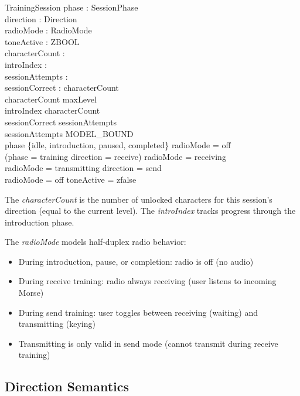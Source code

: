 \documentclass[a4paper,10pt,fleqn]{article}
\begin{document}
\begin{schema}{TrainingSession}
phase : SessionPhase \\
direction : Direction \\
radioMode : RadioMode \\
toneActive : ZBOOL \\
characterCount : \nat \\
introIndex : \nat \\
sessionAttempts : \nat \\
sessionCorrect : \nat
\where
characterCount  \\
characterCount \leq maxLevel \\
introIndex \leq characterCount \\
sessionCorrect \leq sessionAttempts \\
sessionAttempts \leq MODEL\_BOUND \\
phase \in \{idle, introduction, paused, completed\} \implies radioMode = off \\
(phase = training \land direction = receive) \implies radioMode = receiving \\
radioMode = transmitting \implies direction = send \\
radioMode = off \implies toneActive = zfalse
\end{schema}

The \emph{characterCount} is the number of unlocked characters for this session's
direction (equal to the current level). The \emph{introIndex} tracks progress
through the introduction phase.

The \emph{radioMode} models half-duplex radio behavior:
\begin{itemize}
\item During introduction, pause, or completion: radio is off (no audio)
\item During receive training: radio always receiving (user listens to incoming Morse)
\item During send training: user toggles between receiving (waiting) and transmitting (keying)
\item Transmitting is only valid in send mode (cannot transmit during receive training)
\end{itemize}

\subsection{Direction Semantics}
\end{document}
